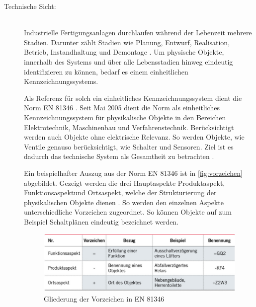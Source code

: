 \begin{description}
    \item[Technische Sicht:]\hfill \\
    Industrielle Fertigungsanlagen durchlaufen während der Lebenzeit mehrere Stadien. Darunter zählt Stadien wie Planung, Entwurf, Realisation, Betrieb, Instandhaltung und Demontage \cite{StefanSchwarzwalder.2019}. Um physische Objekte, innerhalb des Systems und über alle Lebensstadien hinweg eindeutig identifizieren zu können, bedarf es einem einheitlichen Kennzeichnungssystems.

    Als Referenz für solch ein einheitliches Kennzeichnungssystem dient die Norm \glqq EN 81346\grqq{} \cite{StefanSchwarzwalder.2019}. Seit Mai 2005 dient die Norm als einheitliches Kennzeichnungssystem für physikalische Objekte in den Bereichen Elektrotechnik, Maschinenbau und Verfahrenstechnik. Berücksichtigt werden auch Objekte ohne elektrische Relevanz. So werden Objekte, wie Ventile genauso berücksichtigt, wie Schalter und Sensoren. Ziel ist es dadurch das technische System als Gesamtheit zu betrachten \cite{StefanSchwarzwalder.2019}.

    Ein beispielhafter Auszug aus der Norm \glqq EN 81346\grqq{} ist in \autoref{fig:vorzeichen} abgebildet. Gezeigt werden die drei Hauptaspekte \glqq Produktaspekt\grqq, \glqq Funktionsaspekt\grqq und \glqq Ortsaspekt\grqq, welche der Strukturierung der physikalischen Objekte dienen \cite{StefanSchwarzwalder.2019}. So werden den einzelnen Aspekte unterschiedliche Vorzeichen zugeordnet. So können Objekte auf zum Beispiel Schaltplänen eindeutig bezeichnet werden.
    
    \begin{figure}[H]
        \centering
        \includegraphics[width=0.8\linewidth]{images/vorzeichen.png}
        \caption{Gliederung der Vorzeichen in EN 81346 \cite{StefanSchwarzwalder.2019}}
        \label{fig:vorzeichen}
    \end{figure}



\end{description}
